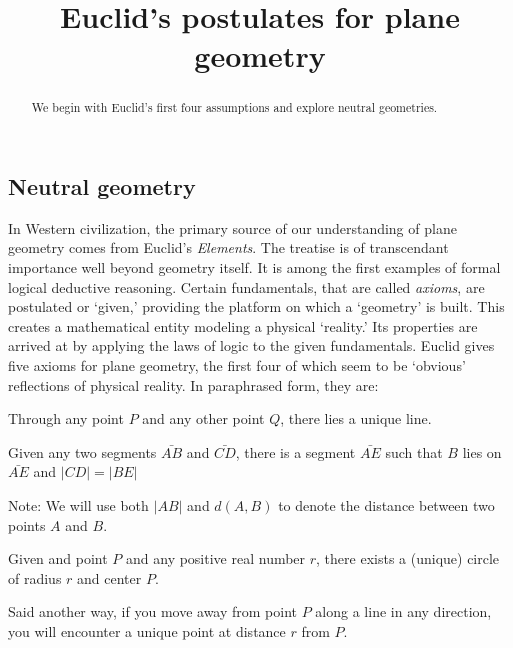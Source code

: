 \documentclass{ximera}
\title{Euclid's postulates for plane geometry} %
\begin{document}
\begin{abstract}
We begin with Euclid's first four assumptions and explore neutral
geometries.
\end{abstract}
\maketitle



\subsection*{Neutral geometry}


In Western civilization, the primary source of our understanding of
plane geometry comes from Euclid's \textit{Elements}. The treatise is
of transcendant importance well beyond geometry itself. It is among
the first examples of formal logical deductive reasoning. Certain
fundamentals, that are called \textit{axioms}, are postulated or
`given,' providing the platform on which a `geometry' is built. This
creates a mathematical entity modeling a physical `reality.' Its
properties are arrived at by applying the laws of logic to the given
fundamentals. Euclid gives five axioms for plane geometry, the first
four of which seem to be `obvious' reflections of physical reality. In
paraphrased form, they are:

\begin{axiom}[E1]
Through any point $P$ and any other point $Q$, there lies a unique
line.
\end{axiom}

\begin{axiom}[E2] 
Given any two segments $\bar{AB}$ and $\bar{CD}$, there is a
segment $\bar{AE}$ such that $B$ lies on $\bar{AE}$ and
$\left\vert CD\right\vert =\left\vert BE\right\vert $

Note: We will use both $\left\vert AB\right\vert$ and $d(A,B)$ to
denote the distance between two points $A$ and $B$.
\end{axiom}

\begin{axiom}[E3]
Given and point $P$ and any positive real number $r$, there exists a
(unique) circle of radius $r$ and center $P$. 

Said another way, if you move away from point $P$ along a line in any
direction, you will encounter a unique point at distance $r$ from $P$.
\end{axiom}
\end{document}
